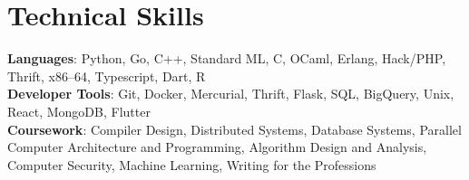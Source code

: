 \documentclass[letterpaper,11pt]{article}
\begin{document}
%
\section{Technical Skills}
 \begin{itemize}[leftmargin=0.15in, label={}]
    \small{\item{
     \textbf{Languages}{: Python, Go, C++, Standard ML, C, OCaml, Erlang, Hack/PHP, Thrift, x86–64, Typescript, Dart, R} \\
     \textbf{Developer Tools}{: Git, Docker, Mercurial, Thrift, Flask, SQL, BigQuery, Unix, React, MongoDB, Flutter} \\
     \textbf{Coursework}{: Compiler Design, Distributed Systems, Database Systems, Parallel Computer Architecture and Programming, Algorithm Design and Analysis, Computer Security, Machine Learning, Writing for the Professions}
    }}
 \end{itemize}


\end{document}
